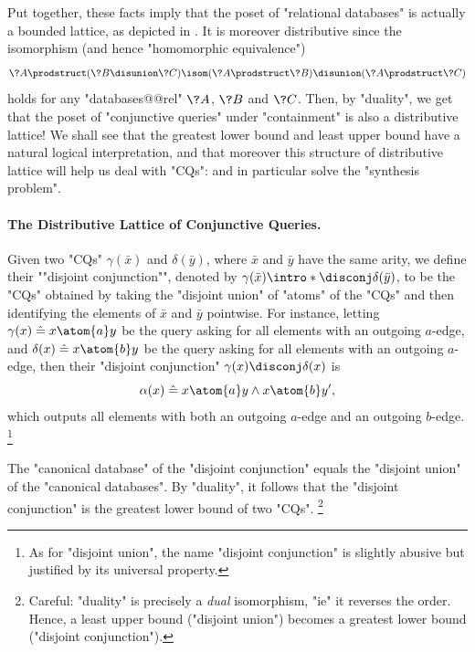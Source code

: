 Put together, these facts imply that the poset of "relational databases" is
actually a bounded lattice, as depicted in .
It is moreover distributive
since the isomorphism (and hence "homomorphic equivalence")
\[
	\?A \prodstruct (\?B \disunion \?C) \isom (\?A \prodstruct \?B) \disunion (\?A \prodstruct \?C)
\]
holds for any "databases@@rel" $\?A$, $\?B$ and $\?C$.
Then, by "duality", we get that the poset of "conjunctive queries"
under "containment" is also a distributive lattice!
We shall see that the greatest lower bound and least upper bound
have a natural logical interpretation, and that moreover
this structure of distributive lattice will help us
deal with "CQs": and in particular
solve the "synthesis problem". 


\paragraph*{The Distributive Lattice of Conjunctive Queries.}

Given two "CQs" $\gamma(\bar x)$ and $\delta(\bar y)$,
where $\bar x$ and $\bar y$ have the same arity, we define
their \AP""disjoint conjunction"", denoted by
$\gamma(\bar x) \intro*\disconj \delta(\bar y)$,
to be the "CQs" obtained by taking the "disjoint union" of "atoms" 
of the "CQs" and then identifying the elements of $\bar x$ and $\bar y$ pointwise.
For instance, letting $\gamma(x) \defeq x \atom{a} y$ be the query
asking for all elements with an outgoing $a$-edge,
and $\delta(x) \defeq x \atom{b} y$ be the query
asking for all elements with an outgoing $a$-edge,
then their "disjoint conjunction" $\gamma(x) \disconj \delta(x)$ is
\[
	\alpha(x) \defeq x \atom{a} y \land x \atom{b} y',
\]
which outputs all elements with both an outgoing $a$-edge and an outgoing $b$-edge.%
\footnote{As for "disjoint union", the name "disjoint conjunction" is slightly abusive
but justified by its universal property.}

\begin{fact}
	The "canonical database" of the "disjoint conjunction"
	equals the "disjoint union" of the "canonical databases".
	By "duality", it follows that
	the "disjoint conjunction" is the greatest lower bound
	of two "CQs".%
	\footnote{Careful: "duality" is precisely a \emph{dual} isomorphism,
	"ie" it reverses the order. Hence, a least upper bound ("disjoint union")
	becomes a greatest lower bound ("disjoint conjunction").}
\end{fact}

